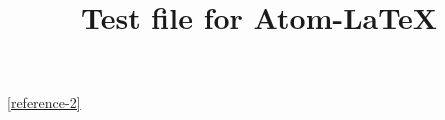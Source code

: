 \documentclass[journal]{IEEEtran}
\begin{document}
\title{Test file for Atom-\LaTeX}

\maketitle

\label{reference-1}

\label{reference-2}
\ref{reference-2}
\end{document}
